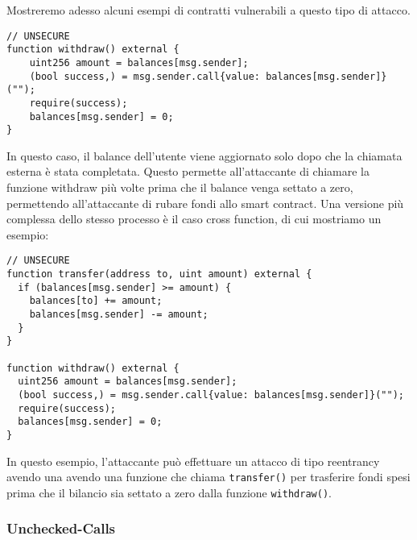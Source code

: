 \documentclass[../../Thesis.tex]{subfiles}
\begin{document}
Mostreremo adesso alcuni esempi di contratti vulnerabili a questo tipo di attacco. 
\begin{lstlisting}[language=Solidity]
// UNSECURE
function withdraw() external {
    uint256 amount = balances[msg.sender];
    (bool success,) = msg.sender.call{value: balances[msg.sender]}("");
    require(success);
    balances[msg.sender] = 0;
}
\end{lstlisting}
In questo caso, il balance dell'utente viene aggiornato solo dopo che la chiamata esterna è stata completata. Questo permette all'attaccante di chiamare la funzione withdraw più volte prima che il balance venga settato a zero, permettendo all'attaccante di rubare fondi allo smart contract.
Una versione più complessa dello stesso processo è il caso cross function, di cui mostriamo un esempio:
\begin{lstlisting}[language=Solidity]
    // UNSECURE
function transfer(address to, uint amount) external {
  if (balances[msg.sender] >= amount) {
    balances[to] += amount;
    balances[msg.sender] -= amount;
  }
}

function withdraw() external {
  uint256 amount = balances[msg.sender];
  (bool success,) = msg.sender.call{value: balances[msg.sender]}("");
  require(success);
  balances[msg.sender] = 0;
}
\end{lstlisting}
In questo esempio, l'attaccante può effettuare un attacco di tipo reentrancy avendo una avendo una funzione che chiama \texttt{transfer()} per trasferire fondi spesi prima che il bilancio sia settato a zero dalla funzione \texttt{withdraw()}.
\subsubsection{Unchecked-Calls}
\end{document}
